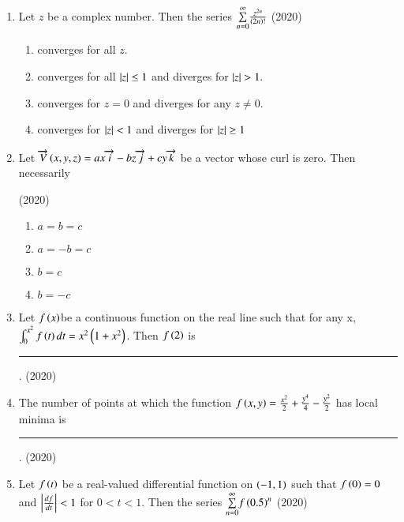 \documentclass[journal]{IEEEtran}
\begin{document}
\begin{enumerate}
\setcounter{enumi}{0}

    \item Let $z$ be a complex number. Then the series $\underset{n=0}{\overset{\infty}{\sum}}\frac{z^{2n}}{\left(2n\right)!}$ 
    \hfill{(2020)}
    

        \begin{enumerate}
            \item converges for all $z.$
            \item converges for all $\left\vert z\right\vert\leq1$ and diverges for $\left\vert z\right\vert>1.$
            \item converges for $z=0$ and diverges for any $z\neq0.$
            \item converges for $\left\vert z\right\vert<1$ and diverges for $\left\vert z\right\vert\geq1$
        \end{enumerate}


    \item Let $\overrightarrow{V}\left(x,y,z\right) = ax\overrightarrow{i}-bz\overrightarrow{j} +cy\overrightarrow{k}$ be a vector whose curl is zero. Then necessarily
    
    \hfill{(2020)}

        \begin{multicols}{4}
        \begin{enumerate}
            \item $a=b=c$
            \item $a=-b=c$
            \item $b=c$
            \item $b=-c$
        \end{enumerate}
    \end{multicols}

    \item Let $f\left(x\right)$be a continuous function on the real line such that for any x, $\int_0^{x^2}f\left(t\right)dt=x^2\left(1+x^2\right)$. Then $f\left(2\right)$ is \rule{1cm}{0.15mm}.
    \hfill{(2020)}


    \item The number of points at which the function $f\left(x,y\right) = \frac{x^2}{2}+\frac{y^4}{4}-\frac{y^2}{2}$ has local minima is \rule{1cm}{0.15mm}.
    \hfill{(2020)}
    

    \item Let $f\left(t\right)$ be a real-valued differential function on $\left(-1,1\right)$ such that $f\left(0\right)=0$ and $\left\vert\frac{df}{dt}\right\vert<1$ for $0<t<1$. Then the series $\underset{n=0}{\overset{\infty}{\sum}}f\left(0.5\right)^n$
    \hfill{(2020)}



\end{enumerate}
\end{document}
